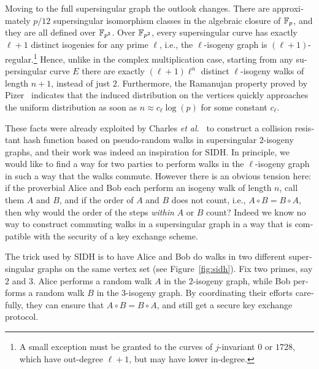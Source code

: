 \begin{otherlanguage}{english}
Moving to the full supersingular graph the outlook changes. There are
approximately $p/12$ supersingular isomorphism classes in the
algebraic closure of $\mathbb{F}_p$, and they are all defined over $\mathbb{F}_{p^2}$.
Over $\mathbb{F}_{p^2}$, every supersingular curve has exactly $\ell+1$
distinct isogenies for any prime $\ell$, i.e., the $\ell$-isogeny
graph is $(\ell+1)$-regular.\footnote{A small exception must be
  granted to the curves of $j$-invariant $0$ or $1728$, which have
  out-degree $\ell+1$, but may have lower in-degree.} Hence, unlike in
the complex multiplication case, starting from any supersingular curve
$E$ there are exactly $(\ell+1)\ell^n$ distinct $\ell$-isogeny walks
of length $n+1$, instead of just $2$. Furthermore, the Ramanujan
property proved by Pizer~\cite{pizer1,pizer2} indicates that the
induced distribution on the vertices quickly approaches the uniform
distribution as soon as $n\approx c_\ell\log(p)$ for some constant
$c_\ell$.

These facts were already exploited by Charles \emph{et
  al.}~\cite{JC:ChaLauGor09} to construct a collision resistant hash
function based on pseudo-random walks in supersingular $2$-isogeny
graphs, and their work was indeed an inspiration for SIDH.  In
principle, we would like to find a way for two parties to perform
walks in the $\ell$-isogeny graph in such a way that the walks
commute. However there is an obvious tension here: if the proverbial
Alice and Bob each perform an isogeny walk of length $n$, call them
$A$ and $B$, and if the order of $A$ and $B$ does not count, i.e.,
$A\circ B=B\circ A$, then why would the order of the steps
\emph{within} $A$ or $B$ count?  Indeed we know no way to construct
commuting walks in a supersingular graph in a way that is compatible
with the security of a key exchange scheme.

The trick used by SIDH is to have Alice and Bob do walks in two
different supersingular graphs on the same vertex set (see
Figure~\ref{fig:sidh}). Fix two primes, say $2$ and $3$. Alice
performs a random walk $A$ in the $2$-isogeny graph, while Bob
performs a random walk $B$ in the $3$-isogeny graph. By coordinating
their efforts carefully, they can ensure that $A\circ B = B\circ A$,
and still get a secure key exchange protocol.


\end{otherlanguage}
